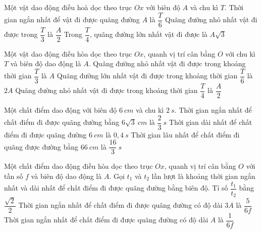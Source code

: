   \setcounter{ex}{0}
\PhanII
\begin{ex}
Một vật dao động điều hoà dọc theo trục $Ox$ với biên độ $A$ và chu kì $T$.
{\True Thời gian ngắn nhất để vật đi được quãng đường $A$ là $\dfrac{T}{6}$}
{Quãng đường nhỏ nhất vật đi được trong $\dfrac{T}{3}$ là $\dfrac{A}{2}$}
{Trong $\dfrac{T}{4}$, quãng đường lớn nhất vật đi được là $A\sqrt{3}$}
\loigiai{
\begin{itemchoice}
\itemch 
\itemch 
\itemch 
\itemch 
\end{itemchoice}
}
\end{ex}
\begin{ex}
Một vật dao động điều hòa dọc theo trục $O x$, quanh vị trí cân bằng $O$ với chu kì $T$ và biên độ dao động là $A$.
{\True Quãng đường nhỏ nhất vật đi được trong khoảng thời gian $\dfrac{T}{3}$ là $A$}
{Quãng đường lớn nhất vật đi được trong khoảng thời gian $\dfrac{T}{6}$ là $2A$}
{Quãng đường nhỏ nhất vật đi được trong khoảng thời gian $\dfrac{T}{4}$ là $\dfrac{A}{2}$}
\loigiai{
\begin{itemchoice}
\itemch
\itemch
\itemch
\itemch
\end{itemchoice}
}
\end{ex} 
\begin{ex}
Một chất điểm dao động với biên độ $6 \ cm$ và chu kì $2 \ s$.
{\True Thời gian ngắn nhất để chất điểm đi được quãng đường bằng $6 \sqrt{3} \ cm$ là $\dfrac{2}{3} \ s$}
{Thời gian dài nhất để chất điểm đi được quãng đường $6 \ cm$ là $0,4 \ s$}
{Thời gian lâu nhất để chất điểm đi quãng được đường bằng $66 \ cm$ là $\dfrac{16}{3} \ s$}
\loigiai{
\begin{itemchoice}
\itemch
\itemch
\itemch
\itemch
\end{itemchoice}
}
\end{ex} 
\begin{ex}
Một chất điểm dao động điều hòa dọc theo trục $O x$, quanh vị trí cân bằng $O$ với tần số $f$ và biên độ dao động là $A$.
{Gọi $t_1$ và $t_2$ lần lượt là khoảng thời gian ngắn nhất và dài nhất để chất điểm đi được quãng đường bằng biên độ. Tỉ số $\dfrac{t_1}{t_2}$ bằng $\dfrac{\sqrt{2}}{2}$}
{Thời gian ngắn nhất để chất điểm đi được quãng đường có độ dài $3A$ là $\dfrac{5}{6 f}$}
{\True Thời gian ngắn nhất để chất điểm đi được quãng đường có độ dài $A$ là $\dfrac{1}{6 f}$}
\loigiai{
\begin{itemchoice}
\itemch
\itemch
\itemch
\itemch
\end{itemchoice}

}
\end{ex} 

